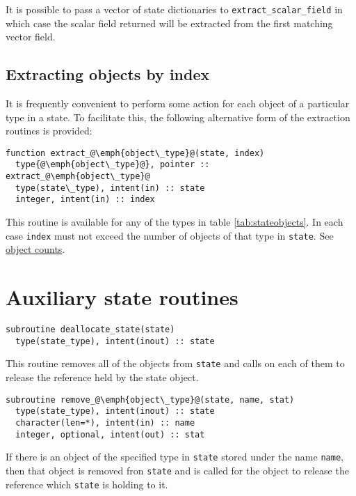 \documentclass[a4paper, 11pt]{book}
\begin{document}
It is possible to pass a vector of state dictionaries to
\lstinline+extract_scalar_field+ in which case the scalar field returned
will be extracted from the first matching vector field.

\subsection{Extracting objects by index}

It is frequently convenient to perform some action for each object of a
particular type in a state. To facilitate this, the following alternative
form of the extraction routines is provided:

\begin{lstlisting}
function extract_@\emph{object\_type}@(state, index)
  type{@\emph{object\_type}@}, pointer :: extract_@\emph{object\_type}@ 
  type(state\_type), intent(in) :: state
  integer, intent(in) :: index
\end{lstlisting}

This routine is available for any of the types in table
\ref{tab:stateobjects}. In each case \lstinline+index+ must not exceed the
number of objects of that type in \lstinline+state+. See 
\hyperlink{proc:objectcounts}{object counts}.


\section{Auxiliary state routines}


\begin{lstlisting}
subroutine deallocate_state(state)
  type(state_type), intent(inout) :: state
\end{lstlisting}

This routine removes all of the objects from \lstinline+state+ and calls
\deallocate on each of them to release the reference held by the state
object.


\begin{lstlisting}
subroutine remove_@\emph{object\_type}@(state, name, stat)
  type(state_type), intent(inout) :: state
  character(len=*), intent(in) :: name
  integer, optional, intent(out) :: stat
\end{lstlisting}

If there is an object of the specified type in \lstinline+state+ stored
under the name \lstinline+name+, then that object is removed fron
\lstinline+state+ and \deallocate is called for the object to release the
reference which \lstinline+state+ is holding to it.
\end{document}
